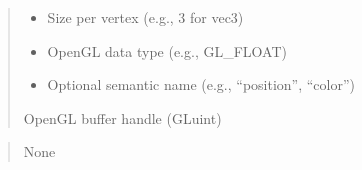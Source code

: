\documentclass[a4paper,10pt,english,openany,oneside]{sphinxmanual}
\begin{document}
\begin{fulllineitems}
\begin{fulllineitems}
\begin{quote}
\begin{description}
\begin{itemize}
\item {} 
\sphinxAtStartPar
{} \textendash{} Size per vertex (e.g., 3 for vec3)

\item {} 
\sphinxAtStartPar
{} \textendash{} OpenGL data type (e.g., GL\_FLOAT)

\item {} 
\sphinxAtStartPar
{} \textendash{} Optional semantic name (e.g., “position”, “color”)

\end{itemize}

\sphinxAtStartPar
OpenGL buffer handle (GLuint)

\end{description}\end{quote}

\end{fulllineitems}


\begin{fulllineitems}
\label{\detokenize{api/buffers:picogl.backend.modern.core.vertex.array.object.VertexArrayObject.delete_buffers}}
\pysigstartsignatures
\pysiglinewithargsret
{}
{}
{}
\pysigstopsignatures\begin{quote}\begin{description}
\sphinxAtStartPar
None

\end{description}\end{quote}

\end{fulllineitems}



\end{fulllineitems}
\end{document}
